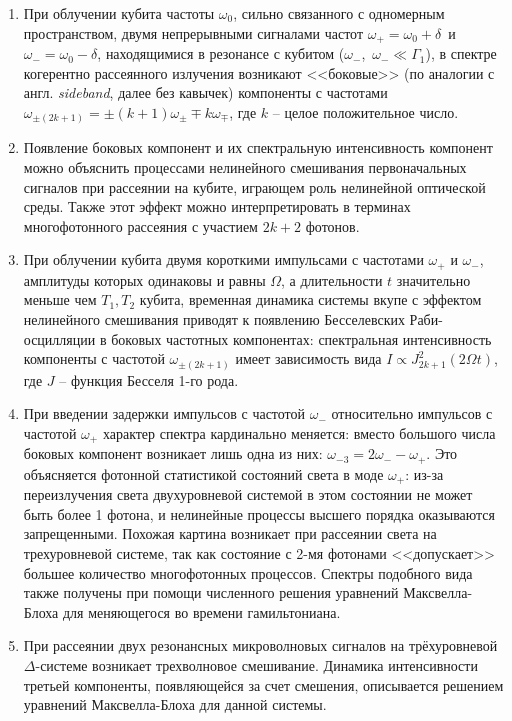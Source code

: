 
{}
\begin{enumerate}
  \item При облучении кубита частоты $\omega_0$, сильно связанного с одномерным пространством, двумя непрерывными сигналами частот $\omega_+=\omega_0+\delta$~и~$\omega_-=\omega_0-\delta$, находящимися в резонансе с кубитом ($\omega_-$,~$\omega_-\ll\Gamma_1$), в спектре когерентно рассеянного излучения возникают <<боковые>> (по аналогии с англ. \textit{sideband}, далее без кавычек) компоненты с частотами $\omega_{\pm(2k+1)}=\pm(k+1)\omega_{\pm}\mp k\omega_{\mp}$, где $k$ -- целое положительное число.
  \item Появление боковых компонент и их спектральную интенсивность компонент можно объяснить процессами нелинейного смешивания первоначальных сигналов при рассеянии на кубите, играющем роль нелинейной оптической среды. Также этот эффект можно интерпретировать в терминах многофотонного рассеяния с участием $2k+2$ фотонов.
  \item При облучении кубита двумя короткими импульсами с частотами $\omega_+$ и $\omega_-$, амплитуды которых одинаковы и равны $\Omega$, а длительности $t$ значительно меньше чем $T_1,T_2$ кубита, временная динамика системы вкупе с эффектом нелинейного смешивания приводят к появлению Бесселевских Раби-осцилляции в боковых частотных компонентах: спектральная интенсивность компоненты с частотой $\omega_{\pm(2k+1)}$ имеет зависимость вида $I \propto J^2_{2k+1}(2\Omega t)$, где $J$ -- функция Бесселя 1-го рода. 
  \item При введении задержки импульсов с частотой $\omega_-$ относительно импульсов с частотой $\omega_+$  характер спектра кардинально меняется: вместо большого числа боковых компонент возникает лишь одна из них: $\omega_{-3} = 2\omega_- - \omega_+$. Это объясняется фотонной статистикой состояний света в моде $\omega_+$: из-за переизлучения света двухуровневой системой в этом состоянии не может быть более 1 фотона, и нелинейные процессы высшего порядка оказываются запрещенными. Похожая картина возникает при рассеянии света на трехуровневой системе, так как состояние с 2-мя фотонами <<допускает>> большее количество многофотонных процессов. Спектры подобного вида также получены при помощи численного решения уравнений Максвелла-Блоха для меняющегося во времени гамильтониана.
  \item При рассеянии двух резонансных микроволновых сигналов на трёхуровневой $\Delta$-системе возникает трехволновое смешивание. Динамика интенсивности третьей компоненты, появляющейся за счет смешения, описывается решением уравнений Максвелла-Блоха для данной системы. 
\end{enumerate}


